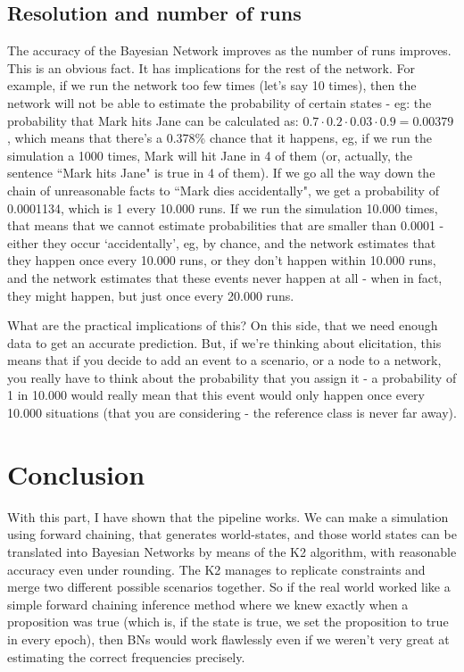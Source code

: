 \subsection{Resolution and number of runs}
The accuracy of the Bayesian Network improves as the number of runs improves. This is an obvious fact. It has implications for the rest of the network. For example, if we run the network too few times (let's say 10 times), then the network will not be able to estimate the probability of certain states - eg: the probability that Mark hits Jane can be calculated as: $0.7 \cdot 0.2 \cdot 0.03 \cdot 0.9 = 0.00379$, which means that there's a 0.378\% chance that it happens, eg, if we run the simulation a 1000 times, Mark will hit Jane in 4 of them (or, actually, the sentence ``Mark hits Jane" is true in 4 of them). If we go all the way down the chain of unreasonable facts to ``Mark dies accidentally", we get a probability of 0.0001134, which is 1 every 10.000 runs. If we run the simulation 10.000 times, that means that we cannot estimate probabilities that are smaller than 0.0001 - either they occur `accidentally', eg, by chance, and the network estimates that they happen once every 10.000 runs, or they don't happen within 10.000 runs, and the network estimates that these events never happen at all - when in fact, they might happen, but just once every 20.000 runs.

What are the practical implications of this? On this side, that we need enough data to get an accurate prediction. But, if we're thinking about elicitation, this means that if you decide to add an event to a scenario, or a node to a network, you really have to think about the probability that you assign it - a probability of 1 in 10.000 would really mean that this event would only happen once every 10.000 situations (that you are considering - the reference class is never far away). 


\section{Conclusion }

With this part, I have shown that the pipeline works. We can make a simulation using forward chaining, that generates world-states, and those world states can be translated into Bayesian Networks by means of the K2 algorithm, with reasonable accuracy even under rounding. The K2 manages to replicate constraints and merge two different possible scenarios together. So if the real world worked like a simple forward chaining inference method where we knew exactly when a proposition was true (which is, if the state is true, we set the proposition to true in every epoch), then BNs would work flawlessly even if we weren't very great at estimating the correct frequencies precisely.

